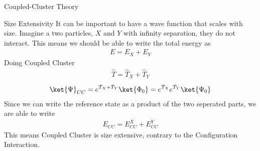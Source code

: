 \documentclass[twoside,english]{uiofysmaster}
\begin{document}
\begin{chapter}{Coupled-Cluster Theory}
  	\begin{section}{Size Extensivity}
  		It can be important to have a wave function that scales with size. Imagine a two particles, $X$ and $Y$ with infinity separation, they do not interact. This means we should be able to write the total energy as
  		\begin{align}
  			E = E_X + E_Y
  		\end{align}
  		Doing Coupled Cluster
  		\begin{align}
  			\hat T = \hat T_X + \hat T_Y 
  		\end{align}
  		\begin{align}
  			\ket{\Psi}_{CC} = e^{\hat T_X + \hat T_Y} \ket{\Phi_0} = e^{\hat T_X} e^{\hat T_Y} \ket{\Psi_0}
  		\end{align}
  		Since we can write the reference state as a product of the two seperated parts, we are able to write
  		\begin{align}
  			E_{CC} = E_{CC}^X + E_{CC}^Y
  		\end{align}
  		This means Coupled Cluster is size extensive, contrary to the Configuration Interaction. 
  	\end{section}


\end{chapter}
\end{document}
